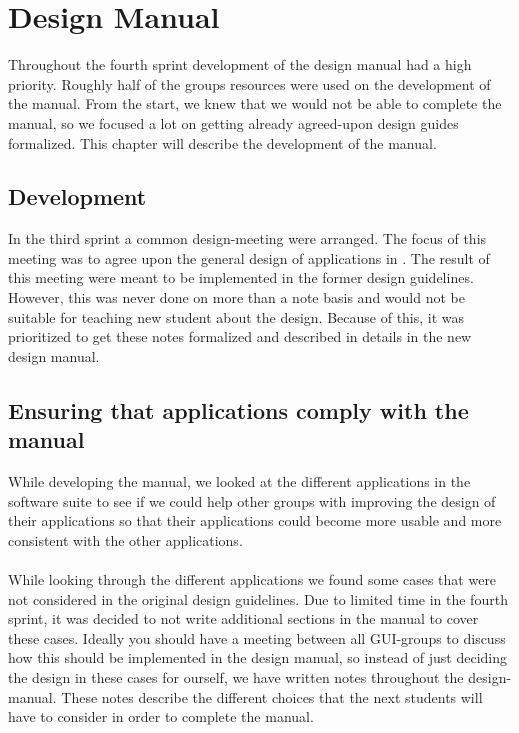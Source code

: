 
\chapter{Design Manual}
\label{cha:design_manual}


Throughout the fourth sprint development of the design manual had a high priority. Roughly half of the groups resources were used on the development of the manual. From the start, we knew that we would not be able to complete the manual, so we focused a lot on getting already agreed-upon design guides formalized. This chapter will describe the development of the manual.

\section{Development}
\label{sec:development}
In the third sprint a common design-meeting were arranged. The focus of this meeting was to agree upon the general design of applications in \giraf. The result of this meeting were meant to be implemented in the former design guidelines. However, this was never done on more than a note basis and would not be suitable for teaching new student about the design. Because of this, it was prioritized to get these notes formalized and described in details in the new design manual. 


\section{Ensuring that applications comply with the manual}
\label{sec:ensuring_that_applications_comply_with_the_manual}
While developing the manual, we looked at the different applications in the \giraf software suite to see if we could help other groups with improving the design of their applications so that their applications could become more usable and more consistent with the other applications. 
\\\\
While looking through the different applications we found some cases that were not considered in the original design guidelines. Due to limited time in the fourth sprint, it was decided to not write additional sections in the manual to cover these cases. Ideally you should have a meeting between all GUI-groups to discuss how this should be implemented in the design manual, so instead of just deciding the design in these cases for ourself, we have written notes throughout the design-manual. These notes describe the different choices that the next students will have to consider in order to complete the manual. 
